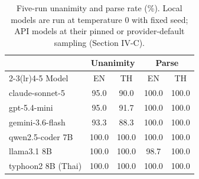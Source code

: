 \begin{table}[t]
\caption{Five-run unanimity and parse rate (\%). Local models are run
at temperature 0 with fixed seed; API models at their pinned or
provider-default sampling (Section IV-C).}
\label{tab:stability}
\centering\small
\begin{tabular}{lcccc}
\toprule
 & \multicolumn{2}{c}{Unanimity} & \multicolumn{2}{c}{Parse} \\
\cmidrule(lr){2-3}\cmidrule(lr){4-5}
Model & EN & TH & EN & TH \\
\midrule
claude-sonnet-5 & 95.0 & 90.0 & 100.0 & 100.0 \\
gpt-5.4-mini & 95.0 & 91.7 & 100.0 & 100.0 \\
gemini-3.6-flash & 93.3 & 88.3 & 100.0 & 100.0 \\
qwen2.5-coder 7B & 100.0 & 100.0 & 100.0 & 100.0 \\
llama3.1 8B & 100.0 & 100.0 & 98.7 & 100.0 \\
typhoon2 8B (Thai) & 100.0 & 100.0 & 100.0 & 100.0 \\
\bottomrule
\end{tabular}
\end{table}
